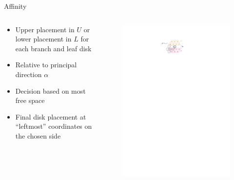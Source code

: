 \documentclass[aspectratio=169,notes]{beamer}
\begin{document}
\begin{frame}{Affinity}

\begin{columns}
\begin{column}{0.45\textwidth}
    \begin{itemize}
    \item Upper placement in $U$ or lower placement in $L$ for each branch and leaf disk
    \item Relative to principal direction $\alpha$
    \item Decision based on most free space
    \item Final disk placement at ``leftmost'' coordinates on the chosen side
    \end{itemize}
\end{column}
\begin{column}{0.4\textwidth}
\begin{figure}
    \centering
    \includegraphics{ch5_affinity.pdf}
\end{figure}
\end{column}
\end{columns}

\end{frame}
\end{document}
